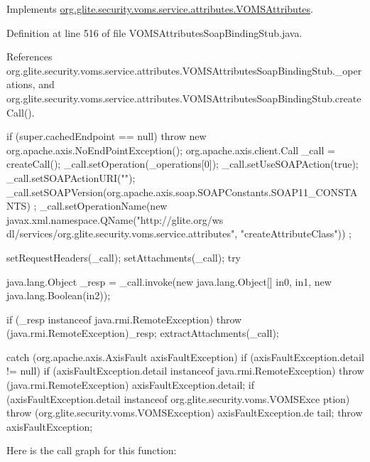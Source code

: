 Implements \hyperlink{interfaceorg_1_1glite_1_1security_1_1voms_1_1service_1_1attributes_1_1VOMSAttributes_ada20938c0dd05bda033b92f9acbc7327}{org.glite.security.voms.service.attributes.VOMSAttributes}.



Definition at line 516 of file VOMSAttributesSoapBindingStub.java.



References org.glite.security.voms.service.attributes.VOMSAttributesSoapBindingStub.\_\-operations, and org.glite.security.voms.service.attributes.VOMSAttributesSoapBindingStub.createCall().


\begin{DoxyCode}
                                                                                 
                                                                                       
         {
        if (super.cachedEndpoint == null) {
            throw new org.apache.axis.NoEndPointException();
        }
        org.apache.axis.client.Call _call = createCall();
        _call.setOperation(_operations[0]);
        _call.setUseSOAPAction(true);
        _call.setSOAPActionURI("");
        _call.setSOAPVersion(org.apache.axis.soap.SOAPConstants.SOAP11_CONSTANTS)
      ;
        _call.setOperationName(new javax.xml.namespace.QName("http://glite.org/ws
      dl/services/org.glite.security.voms.service.attributes", "createAttributeClass"))
      ;

        setRequestHeaders(_call);
        setAttachments(_call);
 try {        java.lang.Object _resp = _call.invoke(new java.lang.Object[] {in0, 
      in1, new java.lang.Boolean(in2)});

        if (_resp instanceof java.rmi.RemoteException) {
            throw (java.rmi.RemoteException)_resp;
        }
        extractAttachments(_call);
  } catch (org.apache.axis.AxisFault axisFaultException) {
    if (axisFaultException.detail != null) {
        if (axisFaultException.detail instanceof java.rmi.RemoteException) {
              throw (java.rmi.RemoteException) axisFaultException.detail;
         }
        if (axisFaultException.detail instanceof org.glite.security.voms.VOMSExce
      ption) {
              throw (org.glite.security.voms.VOMSException) axisFaultException.de
      tail;
         }
   }
  throw axisFaultException;
}
    }
\end{DoxyCode}


Here is the call graph for this function:


